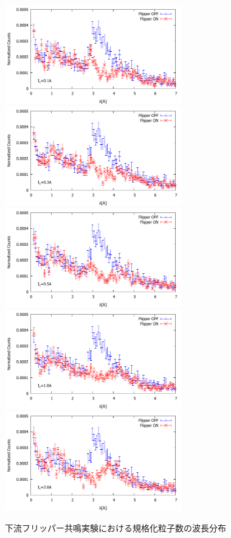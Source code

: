 \begin{figure}[h]
\includegraphics[height=4.3cm]{resonance/analysis/Flipper2_NormalizedCounts_1A.pdf}
\includegraphics[height=4.3cm]{resonance/analysis/Flipper2_NormalizedCounts_3A.pdf}\\
\includegraphics[height=4.3cm]{resonance/analysis/Flipper2_NormalizedCounts_5A.pdf}
\includegraphics[height=4.3cm]{resonance/analysis/Flipper2_NormalizedCounts_10A.pdf}\\
\includegraphics[height=4.3cm]{resonance/analysis/Flipper2_NormalizedCounts_20A.pdf}
\caption{下流フリッパー共鳴実験における規格化粒子数の波長分布}\label{Resonance_fig_Flipper2_NormalizedCounts}
\end{figure}

